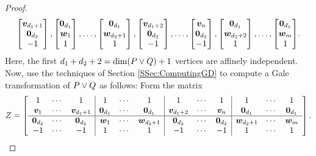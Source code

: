 \begin{proof}
\begin{align*}
{                \begin{bmatrix} \bm{v}_{d_1+1}\\ \bm{0}_{d_2}\\   -1  \end{bmatrix},
                \begin{bmatrix} \bm{0}_{d_1}\\   \bm{w}_1 \\      1   \end{bmatrix},\dotsc,\begin{bmatrix} \bm{0}_{d_1}\\   \bm{w}_{d_2+1}\\ 1   \end{bmatrix},
                \begin{bmatrix} \bm{v}_{d_1+2}\\ \bm{0}_{d_2}\\   -1  \end{bmatrix},\dotsc,\begin{bmatrix} \bm{v}_{n}\\     \bm{0}_{d_2}\\   -1  \end{bmatrix},
                \begin{bmatrix} \bm{0}_{d_1}\\   \bm{w}_{d_2+2}\\ 1   \end{bmatrix},\dotsc,\begin{bmatrix} \bm{0}_{d_1}\\   \bm{w}_{m}\\     1   \end{bmatrix}
                }.
        \end{align*}
    Here, the first \(d_1+d_2+2=\dim(P\vee Q)+1\) vertices are affinely independent.  Now, use the techniques of Section \ref{SSec:ComputingGD} to compute a Gale transformation of \(P\vee Q\) as follows:
    Form the matrix
        \begin{align*}
            Z=
            \left[
            \begin{array}{ccc|ccc|ccc|ccc}
                1               &\cdots  &1               &1               &\cdots  &1
                &1              &\cdots  &1               &1               &\cdots  &1   \\
                \bm{v}_1         &\cdots  &\bm{v}_{d_1+1}   &\bm{0}_{d_1}     &\cdots  &\bm{0}_{d_1}
                &\bm{v}_{d_1+2}  &\cdots  &\bm{v}_n         &\bm{0}_{d_1}     &\cdots  &\bm{0}_{d_1}     \\\hline
                \bm{0}_{d_2}     &\cdots  &\bm{0}_{d_2}     &\bm{w}_1         &\cdots  &\bm{w}_{d_2+1}
                &\bm{0}_{d_2}    &\cdots  &\bm{0}_{d_2}     &\bm{w}_{d_2+1}   &\cdots  &\bm{w}_m         \\
                -1              &\cdots  &-1              &1               &\cdots  &1
                &-1             &\cdots  &-1              &1               &\cdots  &1
            \end{array}
            \right].
        \end{align*}



\end{proof}
